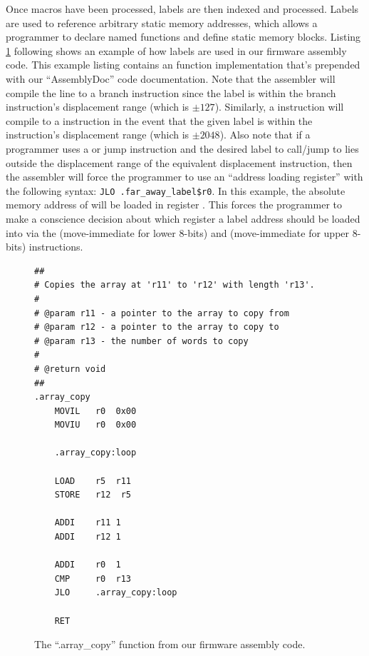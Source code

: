 \documentclass[conference]{IEEEtran}
\begin{document}
Once macros have been processed, labels are then indexed and processed. Labels are used to reference arbitrary static memory addresses, which allows a programmer to declare named functions and define static memory blocks. Listing \ref{listing:assembly_code_labels} following shows an example of how labels are used in our firmware assembly code. This example listing contains an  function implementation that's prepended with our ``AssemblyDoc'' code documentation. Note that the assembler will compile the  line to a branch instruction since the  label is within the branch instruction's displacement range (which is $\pm127$). Similarly, a  instruction will compile to a  instruction in the event that the given label is within the  instruction's displacement range (which is $\pm2048$). Also note that if a programmer uses a  or jump instruction and the desired label to call/jump to lies outside the displacement range of the equivalent displacement instruction, then the assembler will force the programmer to use an ``address loading register'' with the following syntax: \verb|JLO .far_away_label$r0|. In this example, the absolute memory address of  will be loaded in register . This forces the programmer to make a conscience decision about which register a label address should be loaded into via the  (move-immediate for lower 8-bits) and  (move-immediate for upper 8-bits) instructions.
\begin{figure}
  \begin{lstlisting}
##
# Copies the array at 'r11' to 'r12' with length 'r13'.
#
# @param r11 - a pointer to the array to copy from
# @param r12 - a pointer to the array to copy to
# @param r13 - the number of words to copy
#
# @return void
##
.array_copy
    MOVIL   r0  0x00
    MOVIU   r0  0x00

    .array_copy:loop

    LOAD    r5  r11
    STORE   r12  r5

    ADDI    r11 1
    ADDI    r12 1

    ADDI    r0  1
    CMP     r0  r13
    JLO     .array_copy:loop

    RET
  \end{lstlisting}
  \caption{The ``.array\_copy'' function from our firmware assembly code.}
  \label{listing:assembly_code_labels}
\end{figure}
\end{document}
